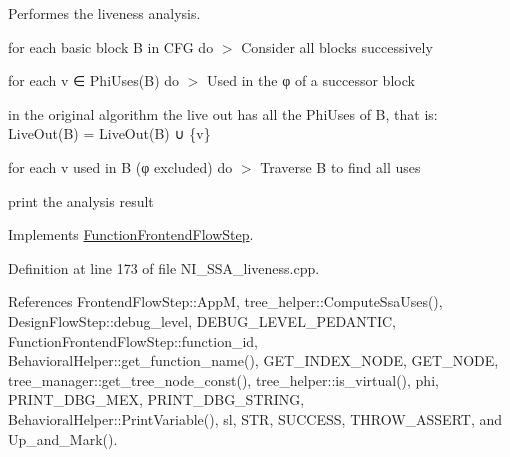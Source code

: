 Performes the liveness analysis. 

for each basic block B in C\+FG do $>$ Consider all blocks successively

for each v ∈ Phi\+Uses(\+B) do $>$ Used in the φ of a successor block

in the original algorithm the live out has all the Phi\+Uses of B, that is\+: Live\+Out(\+B) = Live\+Out(\+B) ∪ \{v\}

for each v used in B (φ excluded) do $>$ Traverse B to find all uses

print the analysis result 

Implements \hyperlink{classFunctionFrontendFlowStep_a00612f7fb9eabbbc8ee7e39d34e5ac68}{Function\+Frontend\+Flow\+Step}.



Definition at line 173 of file N\+I\+\_\+\+S\+S\+A\+\_\+liveness.\+cpp.



References Frontend\+Flow\+Step\+::\+AppM, tree\+\_\+helper\+::\+Compute\+Ssa\+Uses(), Design\+Flow\+Step\+::debug\+\_\+level, D\+E\+B\+U\+G\+\_\+\+L\+E\+V\+E\+L\+\_\+\+P\+E\+D\+A\+N\+T\+IC, Function\+Frontend\+Flow\+Step\+::function\+\_\+id, Behavioral\+Helper\+::get\+\_\+function\+\_\+name(), G\+E\+T\+\_\+\+I\+N\+D\+E\+X\+\_\+\+N\+O\+DE, G\+E\+T\+\_\+\+N\+O\+DE, tree\+\_\+manager\+::get\+\_\+tree\+\_\+node\+\_\+const(), tree\+\_\+helper\+::is\+\_\+virtual(), phi, P\+R\+I\+N\+T\+\_\+\+D\+B\+G\+\_\+\+M\+EX, P\+R\+I\+N\+T\+\_\+\+D\+B\+G\+\_\+\+S\+T\+R\+I\+NG, Behavioral\+Helper\+::\+Print\+Variable(), sl, S\+TR, S\+U\+C\+C\+E\+SS, T\+H\+R\+O\+W\+\_\+\+A\+S\+S\+E\+RT, and Up\+\_\+and\+\_\+\+Mark().

